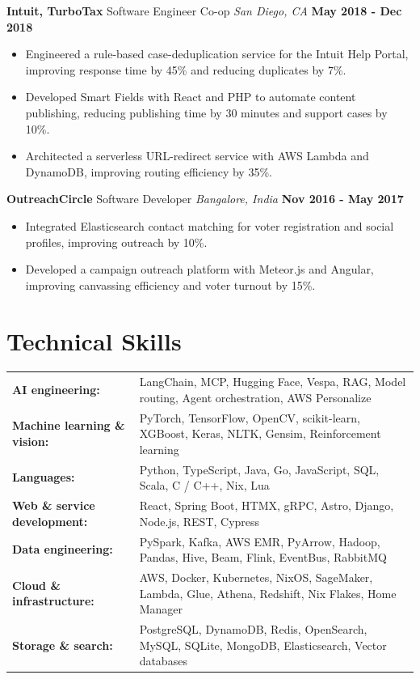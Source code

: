 \documentclass[10pt, letterpaper]{article}
\newcommand{\jobentry}[4]{
  \noindent\textbf{#1} \hfill #2 \hfill \textit{#3} \hfill \textbf{#4}
}
\begin{document}
\newpage
\jobentry{Intuit, TurboTax}{Software Engineer Co-op}{San Diego, CA}{May 2018 - Dec 2018}
\begin{itemize}
\item Engineered a rule-based case-deduplication service for the Intuit Help Portal, improving response time by 45\% and reducing duplicates by 7\%.
\item Developed Smart Fields with React and PHP to automate content publishing, reducing publishing time by 30 minutes and support cases by 10\%.
\item Architected a serverless URL-redirect service with AWS Lambda and DynamoDB, improving routing efficiency by 35\%.
\end{itemize}
\jobentry{OutreachCircle}{Software Developer}{Bangalore, India}{Nov 2016 - May 2017}
\begin{itemize}
\item Integrated Elasticsearch contact matching for voter registration and social profiles, improving outreach by 10\%.
\item Developed a campaign outreach platform with Meteor.js and Angular, improving canvassing efficiency and voter turnout by 15\%.
\end{itemize}

\section{Technical Skills}
\begin{tabularx}{\textwidth}{@{} l X @{}}
\textbf{AI engineering:} & LangChain, MCP, Hugging Face, Vespa, RAG, Model routing, Agent orchestration, AWS Personalize \\
\textbf{Machine learning \& vision:} & PyTorch, TensorFlow, OpenCV, scikit-learn, XGBoost, Keras, NLTK, Gensim, Reinforcement learning \\
\textbf{Languages:} & Python, TypeScript, Java, Go, JavaScript, SQL, Scala, C / C++, Nix, Lua \\
\textbf{Web \& service development:} & React, Spring Boot, HTMX, gRPC, Astro, Django, Node.js, REST, Cypress \\
\textbf{Data engineering:} & PySpark, Kafka, AWS EMR, PyArrow, Hadoop, Pandas, Hive, Beam, Flink, EventBus, RabbitMQ \\
\textbf{Cloud \& infrastructure:} & AWS, Docker, Kubernetes, NixOS, SageMaker, Lambda, Glue, Athena, Redshift, Nix Flakes, Home Manager \\
\textbf{Storage \& search:} & PostgreSQL, DynamoDB, Redis, OpenSearch, MySQL, SQLite, MongoDB, Elasticsearch, Vector databases \\
\end{tabularx}
\end{document}
